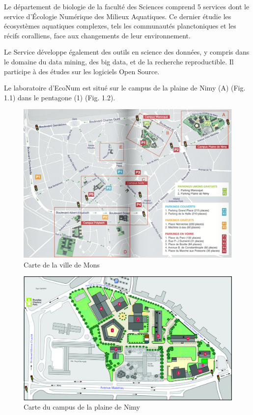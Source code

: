 \documentclass[]{report}
\begin{document}
Le département de biologie de la faculté des Sciences comprend 5
services dont le service d'Écologie Numérique des Milieux Aquatiques. Ce
dernier étudie les écosystèmes aquatiques complexes, tels les
communautés planctoniques et les récifs coralliens, face aux changements
de leur environnement.

Le Service développe également des outils en science des données, y
compris dans le domaine du data mining, des big data, et de la recherche
reproductible. Il participe à des études sur les logiciels Open Source.

Le laboratoire d'EcoNum est situé sur le campus de la plaine de Nimy (A)
(Fig. 1.1) dans le pentagone (1) (Fig. 1.2).

\begin{figure}
\centering
\includegraphics{../image/plan-campus.png}
\caption{Carte de la ville de Mons}
\end{figure}

\begin{figure}
\centering
\includegraphics{../image/plaine-Nimy.jpg}
\caption{Carte du campus de la plaine de Nimy}
\end{figure}
\end{document}
